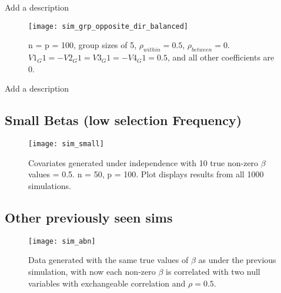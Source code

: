 \begin{table}[hb]
  \centering
  
  \caption{\label{Tab:sim_grp_opposite_dir_selection_freq}Add a description}
\end{table}

\begin{figure}[hbtp]
    \begin{center}
    \texttt{[image: sim\_grp\_opposite\_dir\_balanced]}
    \caption{\label{Fig:sim_grp_opposite_dir_balanced} n = p = 100, group sizes of 5, $\rho_{within} = 0.5$, $\rho_{between} = 0$. $V1_G1 = -V2_G1 = V3_G1 = -V4_G1 = 0.5$, and all other coefficients are 0.}
    \end{center}
\end{figure}

\begin{table}[hb]
    \centering
    
    \caption{\label{Tab:sim_grp_opposite_dir_balanced_selection_freq}Add a description}
  \end{table}

\subsection{Small Betas (low selection Frequency)}

\begin{figure}[hbtp]
    \begin{center}
    \texttt{[image: sim\_small]}
    \caption{\label{Fig:sim_small} Covariates generated under independence with 10 true non-zero $\beta$ values = 0.5. n = 50, p = 100. Plot displays results from all 1000 simulations.}
    \end{center}
\end{figure}


\subsection{Other previously seen sims}

\begin{figure}[hbtp]
    \begin{center}
    \texttt{[image: sim\_abn]}
    \caption{\label{Fig:sim_abn} Data generated with the same true values of $\beta$ as under the previous simulation, with now each non-zero $\beta$ is correlated with two null variables with exchangeable correlation and $\rho = 0.5$.}
    \end{center}
\end{figure}


